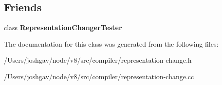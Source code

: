 \subsection*{Friends}
\begin{DoxyCompactItemize}
\item 
class {\bfseries Representation\+Changer\+Tester}\hypertarget{classv8_1_1internal_1_1compiler_1_1_representation_changer_a5656d08ac32912064eddbf38094fd134}{}\label{classv8_1_1internal_1_1compiler_1_1_representation_changer_a5656d08ac32912064eddbf38094fd134}

\end{DoxyCompactItemize}


The documentation for this class was generated from the following files\+:\begin{DoxyCompactItemize}
\item 
/\+Users/joshgav/node/v8/src/compiler/representation-\/change.\+h\item 
/\+Users/joshgav/node/v8/src/compiler/representation-\/change.\+cc\end{DoxyCompactItemize}
